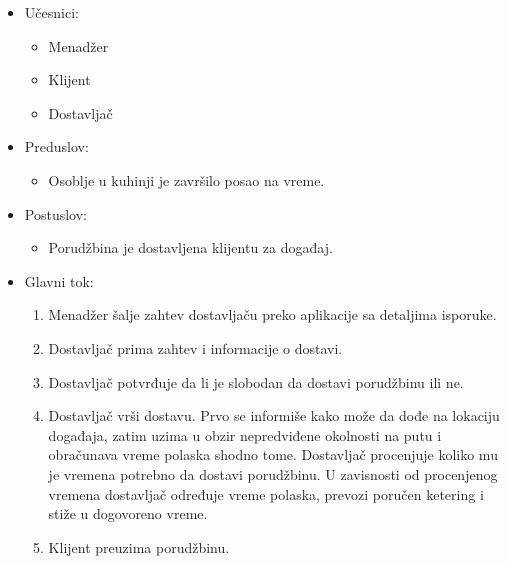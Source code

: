 \documentclass[a4paper]{article}
\begin{document}
  \begin{itemize}
        \item Učesnici:
         \begin{itemize}
        \item Menadžer
    \end{itemize}
          \begin{itemize}
        \item Klijent
    \end{itemize}
      \begin{itemize}
        \item Dostavljač
    \end{itemize}
    \end{itemize}
      \begin{itemize}
        \item Preduslov:
          \begin{itemize}
        \item Osoblje u kuhinji je završilo posao na vreme.
       
   \end{itemize}
    
    \end{itemize}
      \begin{itemize}
        \item Postuslov:
          \begin{itemize}
        \item Porudžbina je dostavljena klijentu za događaj.
    \end{itemize}
    \end{itemize}
      \begin{itemize}
        \item Glavni tok:
          \begin{enumerate}
          
              \item Menadžer šalje zahtev dostavljaču preko aplikacije sa detaljima isporuke.
              
              \item Dostavljač prima zahtev i informacije o dostavi.
          
              \item Dostavljač potvrđuje da li je slobodan da dostavi porudžbinu ili ne.
              
              \item Dostavljač vrši dostavu. Prvo se informiše kako može da dođe na lokaciju događaja, zatim uzima u obzir nepredviđene okolnosti na putu i obračunava vreme polaska shodno tome. Dostavljač procenjuje koliko mu je vremena potrebno da dostavi porudžbinu. U zavisnosti od procenjenog vremena dostavljač određuje vreme polaska, prevozi poručen ketering i stiže u dogovoreno vreme.
         
              \item Klijent preuzima porudžbinu.
          \end{enumerate}
    \end{itemize}
\end{document}
